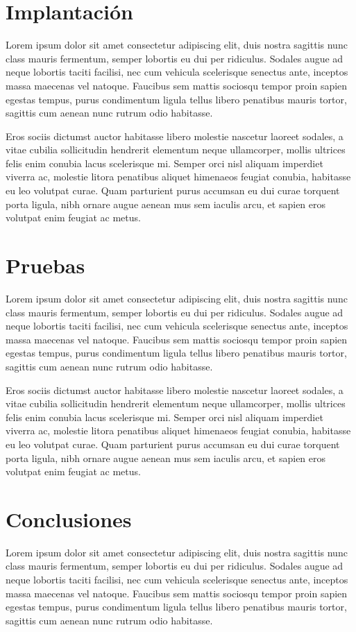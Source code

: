 \documentclass{article}
\begin{document}
\section{Implantación}
Lorem ipsum dolor sit amet consectetur adipiscing elit, duis nostra sagittis nunc class mauris fermentum, semper lobortis eu dui per ridiculus. Sodales augue ad neque lobortis taciti facilisi, nec cum vehicula scelerisque senectus ante, inceptos massa maecenas vel natoque. Faucibus sem mattis sociosqu tempor proin sapien egestas tempus, purus condimentum ligula tellus libero penatibus mauris tortor, sagittis cum aenean nunc rutrum odio habitasse.

Eros sociis dictumst auctor habitasse libero molestie nascetur laoreet sodales, a vitae cubilia sollicitudin hendrerit elementum neque ullamcorper, mollis ultrices felis enim conubia lacus scelerisque mi. Semper orci nisl aliquam imperdiet viverra ac, molestie litora penatibus aliquet himenaeos feugiat conubia, habitasse eu leo volutpat curae. Quam parturient purus accumsan eu dui curae torquent porta ligula, nibh ornare augue aenean mus sem iaculis arcu, et sapien eros volutpat enim feugiat ac metus.
\newpage

\section{Pruebas}
Lorem ipsum dolor sit amet consectetur adipiscing elit, duis nostra sagittis nunc class mauris fermentum, semper lobortis eu dui per ridiculus. Sodales augue ad neque lobortis taciti facilisi, nec cum vehicula scelerisque senectus ante, inceptos massa maecenas vel natoque. Faucibus sem mattis sociosqu tempor proin sapien egestas tempus, purus condimentum ligula tellus libero penatibus mauris tortor, sagittis cum aenean nunc rutrum odio habitasse.

Eros sociis dictumst auctor habitasse libero molestie nascetur laoreet sodales, a vitae cubilia sollicitudin hendrerit elementum neque ullamcorper, mollis ultrices felis enim conubia lacus scelerisque mi. Semper orci nisl aliquam imperdiet viverra ac, molestie litora penatibus aliquet himenaeos feugiat conubia, habitasse eu leo volutpat curae. Quam parturient purus accumsan eu dui curae torquent porta ligula, nibh ornare augue aenean mus sem iaculis arcu, et sapien eros volutpat enim feugiat ac metus.
\newpage

\section{Conclusiones}
Lorem ipsum dolor sit amet consectetur adipiscing elit, duis nostra sagittis nunc class mauris fermentum, semper lobortis eu dui per ridiculus. Sodales augue ad neque lobortis taciti facilisi, nec cum vehicula scelerisque senectus ante, inceptos massa maecenas vel natoque. Faucibus sem mattis sociosqu tempor proin sapien egestas tempus, purus condimentum ligula tellus libero penatibus mauris tortor, sagittis cum aenean nunc rutrum odio habitasse.
\end{document}
